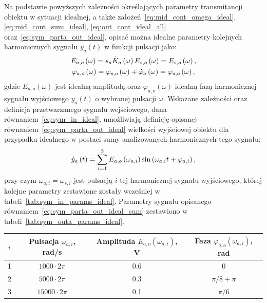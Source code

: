 Na podstawie powyższych zależności określających parametry transmitancji obiektu w sytuacji idealnej, a także założeń~\eqref{eq:mid_cont_omega_ideal}, \eqref{eq:mid_cont_sum_ideal}, \eqref{eq:out_cont_ideal_all} oraz~\eqref{eq:sym_parta_out_ideal}, opisać można idealne parametry kolejnych harmonicznych sygnału $y_{a}(t)$ w funkcji pulsacji jako:
\begin{gather}
E_{a,o} \left(\omega\right) = s_{a} \dot{K}_{a} \left(\omega\right) E_{s,o} \left(\omega\right) = E_{s,o} \left(\omega\right) \label{eq:sym_parta_amp_out_ideal}, \\
\varphi_{a,o} \left(\omega\right) = \varphi_{s,o} \left(\omega\right) + \dot{\varphi}_{a} \left(\omega\right) = \varphi_{s,o} \left(\omega\right) \label{eq:sym_parta_phi_out_ideal},
\end{gather}
gdzie $E_{a,o}(\omega)$ jest idealną amplitudą oraz $\varphi_{a,o}(\omega)$ idealną fazą harmonicznej sygnału wyjściowego $y_{a}(t)$ o wybranej pulsacji $\omega$. Wskazane zależności oraz definicja przetwarzanego sygnału wejściowego, dana równaniem~\eqref{eq:sym_in_ideal}, umożliwiają definicję opisanej równaniem~\eqref{eq:sym_parta_out_ideal} wielkości wyjściowej obiektu dla przypadku idealnego w postaci sumy analizowanych harmonicznych tego sygnału:
\begin{equation}
\dot{y}_{a} \left(t\right) = \sum _{i=1} ^{3} E_{a,o} \left(\omega_{a,i}\right) \sin \left(\omega_{a,i} t + \varphi_{a,i}\right) \label{eq:sym_parta_out_ideal_sum},
\end{equation}
przy czym $\omega_{a,i} = \omega_{s,i}$ jest pulsacją $i$-tej harmonicznej sygnału wyjściowego, której kolejne parametry zestawione zostały wcześniej w tabeli~\ref{tab:sym_in_params_ideal}. Parametry sygnału opisanego równaniem~\eqref{eq:sym_parta_out_ideal_sum} zestawiono w tabeli~\ref{tab:sym_outa_params_ideal}.

\begin{table}[htb!]
\begin{tabular}[c]{| c | c | c | c |} \hline
\textbf{$i$} & \textbf{Pulsacja $\omega_{a,i}$, rad/s} & \textbf{Amplituda $E_{a,o}(\omega_{a,i})$, V} & \textbf{Faza $\varphi_{a,o}(\omega_{a,i})$, rad} \\ \hline
1 & $1000  \cdot 2\pi$ &  \num{0.6} & $0$             \\ \hline
2 & $5000  \cdot 2\pi$ &  \num{0.3} & $\pi/8 + \pi$   \\ \hline
3 & $15000 \cdot 2\pi$ &  \num{0.1} & $\pi/6$         \\ \hline
\end{tabular}
\end{table}

